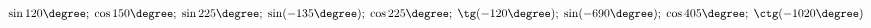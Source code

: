 \begin{ex}[type=calculate]
	\begin{condition}
		\( \sin120\degree;\;\cos150\degree;\;\sin225\degree;\;\sin(-135\degree);\;\cos225\degree;\;\tg(-120\degree);\;\sin(-690\degree);\;\cos405\degree;\;\ctg(-1020\degree) \)
	\end{condition}
\end{ex}